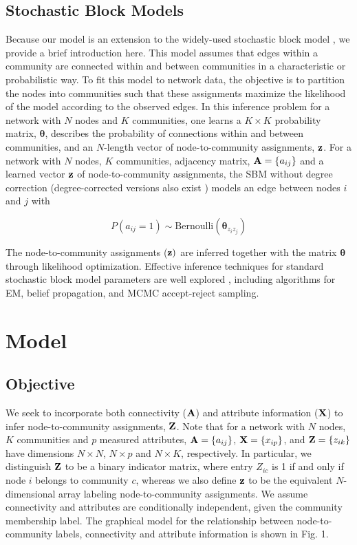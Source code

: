 \documentclass[journal]{IEEEtran}
\begin{document}
\subsection{Stochastic Block Models}
Because our model is an extension to the widely-used stochastic block model \cite{sbmOrig}, we provide a brief introduction here. This model assumes that edges within a community are connected within and between communities in a characteristic or probabilistic way. To fit this model to network data, the objective is to partition the nodes into communities such that these assignments maximize the likelihood of the model according to the observed edges. In this inference problem for a network with $N$ nodes and $K$ communities, one learns a $K \times K$ probability matrix, ${\boldsymbol \theta}$, describes the probability of connections within and between communities, and an $N$-length vector of node-to-community assignments, ${\bf z}$. For a network with $N$ nodes, $K$ communities, adjacency matrix, ${\bf A}=\{a_{ij}\}$ and a learned vector ${\bf z}$ of node-to-community assignments, the SBM without degree correction (degree-corrected versions also exist \cite{degreeCorrect}) models an edge between nodes $i$ and $j$ with

\begin{equation}
P(a_{ij}=1) \sim \text{Bernoulli}(\boldsymbol \theta_{z_{i}z_{j}})
\end{equation}

The node-to-community assignments (${\bf z})$ are inferred together with the matrix ${\boldsymbol \theta}$ through likelihood optimization. Effective inference techniques for standard stochastic block model parameters are well explored \cite{comparative,tiagomcmc,dudin}, including algorithms for EM, belief propagation, and MCMC accept-reject sampling. 

\section{Model}
\subsection{Objective}
We seek to incorporate both connectivity (${\bf A}$) and attribute information (${\bf X}$) to infer node-to-community assignments, ${\bf Z}$. Note that for a network with $N$ nodes, $K$ communities and $p$ measured attributes, ${\bf A}=\{a_{ij}\}$, ${\bf X}=\{x_{ip}\}$, and ${\bf Z}=
\{z_{ik}\}$ have dimensions $N \times N$, $N \times p$ and $N \times K$, respectively. In particular, we distinguish ${\bf Z}$ to be a binary indicator matrix, where entry $Z_{ic}$ is 1 if and only if node $i$ belongs to community $c$, whereas we also define ${\bf z}$ to be the equivalent $N$-dimensional array labeling node-to-community assignments. We assume connectivity and attributes are conditionally independent, given the community membership label. The graphical model for the relationship between node-to-community labels, connectivity and attribute information is shown in Fig. 1.
\end{document}
